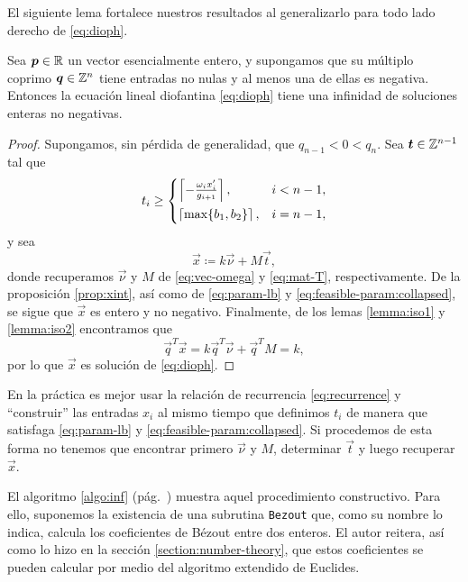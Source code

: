 El siguiente lema fortalece nuestros resultados al generalizarlo para todo lado derecho de
\eqref{eq:dioph}.
\begin{lemma}
	\label{lemma:t-existence}
	Sea $\boldsymbol{p} \in \mathbb{R}$ un vector esencialmente entero, y supongamos que su múltiplo coprimo
	$\boldsymbol{q} \in \mathbb{Z}^n$ tiene entradas no nulas y al menos una de ellas es negativa. Entonces la
	ecuación lineal diofantina \eqref{eq:dioph} tiene una infinidad de soluciones enteras no
	negativas.
\end{lemma}
\begin{proof}
	Supongamos, sin pérdida de generalidad, que $q_{n-1} < 0 < q_n$. Sea $\boldsymbol{t} \in \mathbb{Z}^{n-1}$ tal
	que
	\begin{equation*}
		t_i \geq \begin{cases}
			\left\lceil -\frac{\omega_ix_i'}{g_{i + 1}} \right\rceil, & i < n - 1, \\[0.5em]
			\left\lceil \max\lbrace b_1, b_2 \rbrace \right\rceil, & i = n - 1,
		\end{cases}
	\end{equation*}
	y sea
	\begin{equation*}
		\vec{x} \coloneq k\vec{\nu} + M\vec{t},
	\end{equation*}
	donde recuperamos $\vec{\nu}$ y $M$ de \eqref{eq:vec-omega} y \eqref{eq:mat-T}, respectivamente.
	De la proposición \ref{prop:xint}, así como de \eqref{eq:param-lb} y
	\eqref{eq:feasible-param:collapsed}, se sigue que $\vec{x}$ es entero y no negativo. Finalmente,
	de los lemas \ref{lemma:iso1} y \ref{lemma:iso2} encontramos que
	\begin{equation*}
		\vec{q}^T\vec{x} = k\vec{q}^T\vec{\nu} + \vec{q}^TM = k,
	\end{equation*}
	por lo que $\vec{x}$ es solución de \eqref{eq:dioph}.
\end{proof}

En la práctica es mejor usar la relación de recurrencia \eqref{eq:recurrence} y ``construir'' las
entradas $x_i$ al mismo tiempo que definimos $t_i$ de manera que satisfaga \eqref{eq:param-lb} y
\eqref{eq:feasible-param:collapsed}. Si procedemos de esta forma no tenemos que encontrar primero
$\vec{\nu}$ y $M$, determinar $\vec{t}$ y luego recuperar $\vec{x}$.

El algoritmo \ref{algo:inf} (pág.~\pageref{algo:inf}) muestra aquel procedimiento constructivo.
Para ello, suponemos la existencia de una subrutina \texttt{Bezout} que, como su nombre lo indica,
calcula los coeficientes de Bézout entre dos enteros. El autor reitera, así como lo hizo en la
sección \ref{section:number-theory}, que estos coeficientes se pueden calcular por medio del
algoritmo extendido de Euclides.

